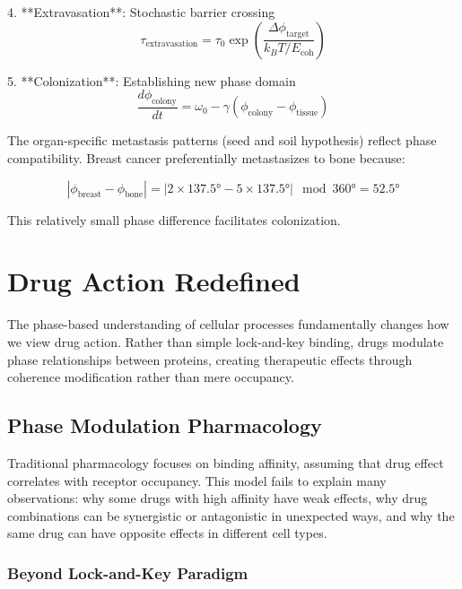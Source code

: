 \documentclass[12pt,a4paper]{report}
\begin{document}
4. **Extravasation**: Stochastic barrier crossing
   \begin{equation}
   \tau_{\text{extravasation}} = \tau_0 \exp\left(\frac{\Delta\phi_{\text{target}}}{k_B T/E_{\text{coh}}}\right)
   \end{equation}

5. **Colonization**: Establishing new phase domain
   \begin{equation}
   \frac{d\phi_{\text{colony}}}{dt} = \omega_0 - \gamma(\phi_{\text{colony}} - \phi_{\text{tissue}})
   \end{equation}

The organ-specific metastasis patterns (seed and soil hypothesis) reflect phase compatibility. Breast cancer preferentially metastasizes to bone because:

\begin{equation}
|\phi_{\text{breast}} - \phi_{\text{bone}}| = |2 \times 137.5° - 5 \times 137.5°| \mod 360° = 52.5°
\end{equation}

This relatively small phase difference facilitates colonization.

\chapter{Drug Action Redefined}

The phase-based understanding of cellular processes fundamentally changes how we view drug action. Rather than simple lock-and-key binding, drugs modulate phase relationships between proteins, creating therapeutic effects through coherence modification rather than mere occupancy.

\section{Phase Modulation Pharmacology}

Traditional pharmacology focuses on binding affinity, assuming that drug effect correlates with receptor occupancy. This model fails to explain many observations: why some drugs with high affinity have weak effects, why drug combinations can be synergistic or antagonistic in unexpected ways, and why the same drug can have opposite effects in different cell types.

\subsection{Beyond Lock-and-Key Paradigm}
\end{document}
